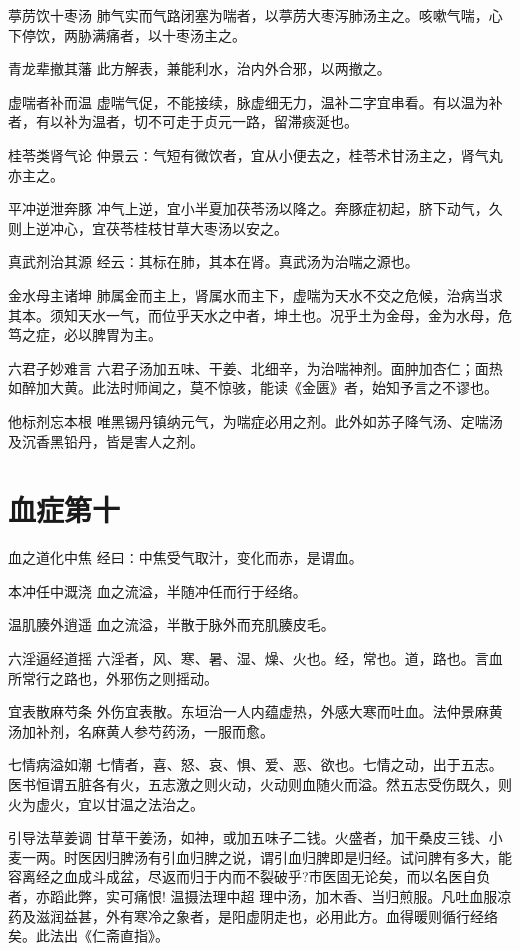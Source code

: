 \documentclass[a4paper,12pt,UTF8,twoside]{ctexbook}
\begin{document}
    葶苈饮十枣汤
    肺气实而气路闭塞为喘者，以葶苈大枣泻肺汤主之。咳嗽气喘，心下停饮，两胁满痛者，以十枣汤主之。
    
    青龙辈撤其藩
    此方解表，兼能利水，治内外合邪，以两撤之。
    
    虚喘者补而温
    虚喘气促，不能接续，脉虚细无力，温补二字宜串看。有以温为补者，有以补为温者，切不可走于贞元一路，留滞痰涎也。
    
    桂苓类肾气论
    仲景云∶气短有微饮者，宜从小便去之，桂苓术甘汤主之，肾气丸亦主之。
    
    平冲逆泄奔豚
    冲气上逆，宜小半夏加茯苓汤以降之。奔豚症初起，脐下动气，久则上逆冲心，宜茯苓桂枝甘草大枣汤以安之。
    
    真武剂治其源
    经云∶其标在肺，其本在肾。真武汤为治喘之源也。
    
    金水母主诸坤
    肺属金而主上，肾属水而主下，虚喘为天水不交之危候，治病当求其本。须知天水一气，而位乎天水之中者，坤土也。况乎土为金母，金为水母，危笃之症，必以脾胃为主。
    
    六君子妙难言
    六君子汤加五味、干姜、北细辛，为治喘神剂。面肿加杏仁；面热如醉加大黄。此法时师闻之，莫不惊骇，能读《金匮》者，始知予言之不谬也。
    
    他标剂忘本根
    唯黑锡丹镇纳元气，为喘症必用之剂。此外如苏子降气汤、定喘汤及沉香黑铅丹，皆是害人之剂。
    
    \chapter{血症第十}
    血之道化中焦
    经曰∶中焦受气取汁，变化而赤，是谓血。
    
    本冲任中溉浇
    血之流溢，半随冲任而行于经络。
    
    温肌腠外逍遥
    血之流溢，半散于脉外而充肌腠皮毛。
    
    六淫逼经道摇
    六淫者，风、寒、暑、湿、燥、火也。经，常也。道，路也。言血所常行之路也，外邪伤之则摇动。
    
    宜表散麻芍条
    外伤宜表散。东垣治一人内蕴虚热，外感大寒而吐血。法仲景麻黄汤加补剂，名麻黄人参芍药汤，一服而愈。
    
    七情病溢如潮
    七情者，喜、怒、哀、惧、爱、恶、欲也。七情之动，出于五志。医书恒谓五脏各有火，五志激之则火动，火动则血随火而溢。然五志受伤既久，则火为虚火，宜以甘温之法治之。
    
    引导法草姜调
    甘草干姜汤，如神，或加五味子二钱。火盛者，加干桑皮三钱、小麦一两。时医因归脾汤有引血归脾之说，谓引血归脾即是归经。试问脾有多大，能容离经之血成斗成盆，尽返而归于内而不裂破乎?市医固无论矣，而以名医自负者，亦蹈此弊，实可痛恨!
    温摄法理中超
    理中汤，加木香、当归煎服。凡吐血服凉药及滋润益甚，外有寒冷之象者，是阳虚阴走也，必用此方。血得暖则循行经络矣。此法出《仁斋直指》。
    
\end{document}
